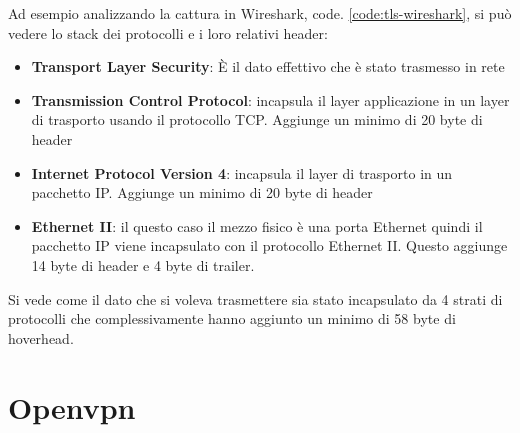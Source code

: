 Ad esempio analizzando la cattura in Wireshark, code. \ref{code:tls-wireshark}, si può vedere lo stack dei protocolli e i loro relativi header:

\begin{itemize}
    \item \textbf{Transport Layer Security}\cite{RFC_8446}: È il dato effettivo che è stato trasmesso in rete  
    
    \item \textbf{Transmission Control Protocol}\cite{RFC_0793}: incapsula il layer applicazione in un layer di trasporto usando il protocollo TCP. Aggiunge un minimo di 20 byte di header 
    
    \item \textbf{Internet Protocol Version 4}\cite{RFC_0791}: incapsula il layer di trasporto in un pacchetto IP. Aggiunge un minimo di 20 byte di header 
    
    \item \textbf{Ethernet II}\cite{ethernet-ii}: il questo caso il mezzo fisico è una porta Ethernet quindi il pacchetto IP viene incapsulato con il protocollo Ethernet II. Questo aggiunge 14 byte di header e 4 byte di trailer.
\end{itemize}

Si vede come il dato che si voleva trasmettere sia stato incapsulato da 4 strati di protocolli che complessivamente hanno aggiunto un minimo di 58 byte di hoverhead.


\section{Openvpn}




